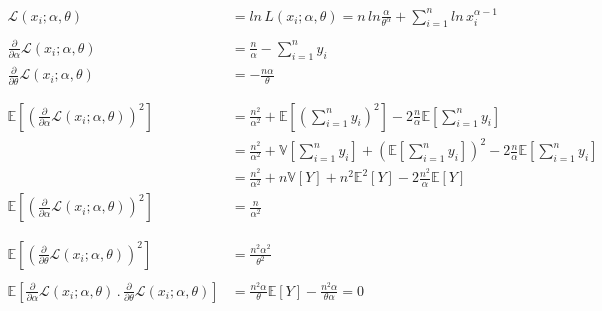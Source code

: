 \documentclass[
  12pt,
]{scrreprt}
\begin{document}
\[\begin{aligned}
\mathcal{L}(x_i;\alpha,\theta) &= ln\, L(x_i;\alpha,\theta) = n\,ln\frac{\alpha}{\theta^\alpha} + \sum_{i=1}^n ln\,x_i^{\alpha-1}\\
&\\
\frac{\partial}{\partial \alpha}\mathcal{L}(x_i;\alpha,\theta)&=\frac{n}{\alpha} - \sum_{i=1}^n y_i\\
\frac{\partial}{\partial \theta}\mathcal{L}(x_i;\alpha,\theta)&=-\frac{n\alpha}{\theta}\\
&\\
&\\
\mathbb{E}\left [ \left (\frac{\partial}{\partial \alpha}\mathcal{L}(x_i;\alpha,\theta)\right )^{2}\right ]&=\frac{n^2}{\alpha^2}+\mathbb{E}\left [ \left (\sum_{i=1}^n y_i\right )^{2}\right ] - 2\frac{n}{\alpha}\mathbb{E}\left [\sum_{i=1}^n y_i\right ]\\
&=\frac{n^2}{\alpha^2}+\mathbb{V}\left [\sum_{i=1}^n y_i\right ] + \left ( \mathbb{E}\left [\sum_{i=1}^n y_i\right ]\right )^2 - 2\frac{n}{\alpha}\mathbb{E}\left [\sum_{i=1}^n y_i\right ]\\
&=\frac{n^2}{\alpha^2}+n\mathbb{V}[Y] + n^2\mathbb{E}^2[Y] - 2\frac{n^2}{\alpha}\mathbb{E}[Y]\\
\mathbb{E}\left [ \left (\frac{\partial}{\partial \alpha}\mathcal{L}(x_i;\alpha,\theta)\right )^{2}\right ]&=\frac{n}{\alpha^2}\\
&\\
&\\
\mathbb{E}\left [ \left (\frac{\partial}{\partial \theta}\mathcal{L}(x_i;\alpha,\theta)\right )^{2}\right ]&=\frac{n^2\alpha^2}{\theta^2}\\
&\\
\mathbb{E}\left [ \frac{\partial}{\partial \alpha}\mathcal{L}(x_i;\alpha,\theta)\,.\,\frac{\partial}{\partial \theta}\mathcal{L}(x_i;\alpha,\theta)\right ]&= \frac{n^2\alpha}{\theta}\mathbb{E}[Y] - \frac{n^2\alpha}{\theta\alpha} = 0\\
&\\
\end{aligned}\]
\end{document}

